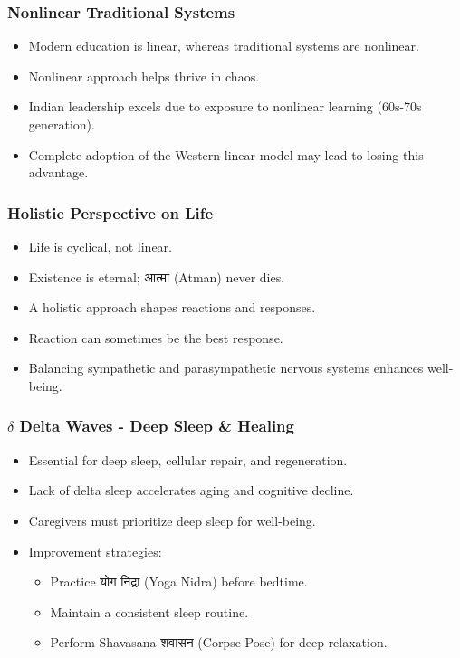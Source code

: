 \begin{frame}[fragile]\frametitle{Nonlinear Traditional Systems}
      \begin{itemize}
          \item Modern education is linear, whereas traditional systems are nonlinear.
          \item Nonlinear approach helps thrive in chaos.
          \item Indian leadership excels due to exposure to nonlinear learning (60s-70s generation).
          \item Complete adoption of the Western linear model may lead to losing this advantage.
      \end{itemize}
\end{frame}

\begin{frame}[fragile]\frametitle{Holistic Perspective on Life}
      \begin{itemize}
          \item Life is cyclical, not linear.
          \item Existence is eternal; आत्मा (Atman) never dies.
          \item A holistic approach shapes reactions and responses.
          \item Reaction can sometimes be the best response.
          \item Balancing sympathetic and parasympathetic nervous systems enhances well-being.
      \end{itemize}
\end{frame}

\begin{frame}[fragile]\frametitle{$\delta$ Delta Waves - Deep Sleep \& Healing}
      \begin{itemize}
          \item Essential for deep sleep, cellular repair, and regeneration.
          \item Lack of delta sleep accelerates aging and cognitive decline.
          \item Caregivers must prioritize deep sleep for well-being.
          \item Improvement strategies:
            \begin{itemize}
                \item Practice योग निद्रा (Yoga Nidra) before bedtime.
                \item Maintain a consistent sleep routine.
                \item Perform Shavasana शवासन (Corpse Pose) for deep relaxation.
            \end{itemize}
      \end{itemize}
\end{frame}

